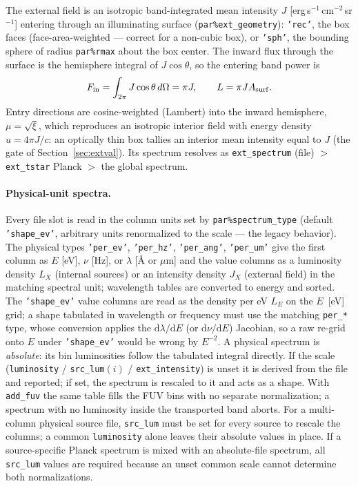 \documentclass[english,a4paper]{my_memo}
\newcommand{\code}[1]{\texttt{#1}}
\begin{document}
The external field is an isotropic band-integrated mean intensity $J$
[erg\,s$^{-1}$\,cm$^{-2}$\,sr$^{-1}$] entering through an illuminating
surface (\code{par\%ext\_geometry}): \code{'rec'}, the box faces
(face-area-weighted --- correct for a non-cubic box), or \code{'sph'},
the bounding sphere of radius \code{par\%rmax} about the box center.
The inward flux through the surface is the hemisphere integral of
$J\cos\theta$, so the entering band power is
\begin{equation}
  F_{\rm in} = \int_{2\pi} J\cos\theta\,d\Omega = \pi J,
  \qquad
  L = \pi J A_{\rm surf}.
  \label{eq:extlum}
\end{equation}
Entry directions are cosine-weighted (Lambert) into the inward
hemisphere, $\mu = \sqrt{\xi}$, which reproduces an isotropic interior
field with energy density $u = 4\pi J/c$: an optically thin box tallies
an interior mean intensity equal to $J$ (the gate of
Section~\ref{sec:extval}).  Its spectrum resolves as
\code{ext\_spectrum} (file) $>$ \code{ext\_tstar} Planck $>$
the global spectrum.

\paragraph{Physical-unit spectra.}  Every file slot is read in the
column units set by \code{par\%spectrum\_type} (default \code{'shape\_ev'},
arbitrary units renormalized to the scale --- the legacy behavior).  The
physical types \code{'per\_ev'}, \code{'per\_hz'}, \code{'per\_ang'},
\code{'per\_um'} give the first column as $E$ [eV], $\nu$ [Hz], or
$\lambda$ [\AA{} or $\mu$m] and the value columns as a luminosity
density $L_X$ (internal sources) or an intensity density $J_X$ (external
field) in the matching spectral unit; wavelength tables are converted to
energy and sorted.  The \code{'shape\_ev'} value columns are read as the
density per eV $L_E$ on the $E$~[eV] grid; a shape tabulated in
wavelength or frequency must use the matching \code{per\_*} type, whose
conversion applies the $\mathrm{d}\lambda/\mathrm{d}E$ (or
$\mathrm{d}\nu/\mathrm{d}E$) Jacobian, so a raw re-grid onto $E$ under
\code{'shape\_ev'} would be wrong by $E^{-2}$.  A physical spectrum is
\emph{absolute}: its bin
luminosities follow the tabulated integral directly.  If the scale
(\code{luminosity} / \code{src\_lum}$(i)$ / \code{ext\_intensity}) is
unset it is derived from the file and reported; if set, the spectrum is
rescaled to it and acts as a shape.  With \code{add\_fuv} the same table
fills the FUV bins with no separate normalization; a spectrum with no
luminosity inside the transported band aborts.
For a multi-column physical source file, \code{src\_lum} must be set
for every source to rescale the columns; a common \code{luminosity}
alone leaves their absolute values in place.  If a source-specific
Planck spectrum is mixed with an absolute-file spectrum, all
\code{src\_lum} values are required because an unset common scale
cannot determine both normalizations.
\end{document}

